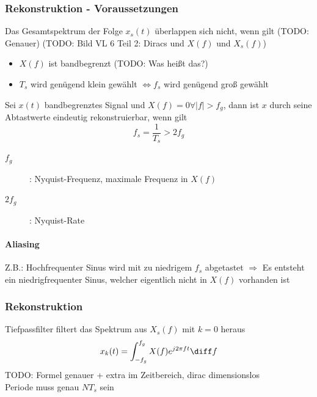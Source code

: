 \begin{sectionbox}
    \subsubsection{Rekonstruktion - Voraussetzungen}
    Das Gesamtspektrum der Folge $x_s(t)$ überlappen sich nicht, wenn gilt (TODO: Genauer) (TODO: Bild VL 6 Teil 2: Diracs und $X(f)$ und $X_s(f)$)
    \begin{itemize}
        \item $X(f)$ ist bandbegrenzt (TODO: Was heißt das?)
        \item $T_s$ wird genügend klein gewählt $\Leftrightarrow f_s$ wird genügend groß gewählt
    \end{itemize}

    \begin{emphbox}
        Sei $x(t)$ bandbegrenztes Signal und $X(f) = 0 \forall |f|>f_g$, dann ist $x$ durch seine Abtastwerte eindeutig rekonstruierbar, wenn gilt
        \begin{equation*}
            f_s =\frac{1}{T_s} > 2f_g
        \end{equation*}
    \end{emphbox}
    \begin{description}
        \item[$f_g$]: Nyquist-Frequenz, maximale Frequenz in $X(f)$
        \item[$2f_g$]: Nyquist-Rate
    \end{description}

    \paragraph{Aliasing} Z.B.: Hochfrequenter Sinus wird mit zu niedrigem $f_s$ abgetastet $\Rightarrow$ Es entsteht ein niedrigfrequenter Sinus, welcher eigentlich nicht in $X(f)$ vorhanden ist

    \subsubsection{Rekonstruktion}
    Tiefpassfilter filtert das Spektrum aus $X_s(f)$ mit $k=0$ heraus
    \begin{equation*}
        x_k(t) = \int_{-f_g}^{f_g}X(f)e^{j2\pi ft}\diff f
    \end{equation*}
    TODO: Formel genauer + extra im Zeitbereich, dirac dimensionslos \\
    Periode muss genau $NT_s$ sein
\end{sectionbox}

